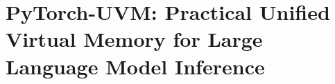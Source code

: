 \section{PyTorch-UVM: Practical Unified Virtual Memory for Large Language Model Inference}
\label{chp:uvmtorch}

\graphicspath{{pytorch-uvm/}}

\newcommand{\uvmname}{PyTorch-UVM}
\providecommand{\CodeIn}[1]{{\small\texttt{#1}}}
\providecommand{\Description}[1]{}
\providecommand*\BC[1]{\begin{tikzpicture}[baseline=(C.base)]%
    \node[draw,circle,fill=black,inner sep=0.1pt](C){\textcolor{white}{#1}};%
    \end{tikzpicture}}













